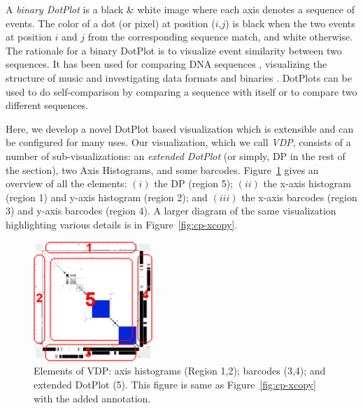 
A {\em binary DotPlot} is a black \& white image
where each axis denotes a sequence of events.
The color of a dot (or pixel) at position ($i$,$j$) is black
when the two events at position $i$ and $j$ from the corresponding sequence
match, and white otherwise.
The rationale for a binary DotPlot is to visualize event similarity
between two sequences.
It has been used for comparing DNA sequences \cite{maizel1981enhanced},
visualizing the structure of music \cite{foote1999visualizing}
and investigating data formats and binaries \cite{kaminsky2006black}.
DotPlots can be used to do self-comparison
by comparing a sequence with itself or to compare
two different sequences.

Here, we develop a novel DotPlot based visualization which is
extensible and can be configured for many uses.
Our visualization, which we call {\em VDP},
consists of a number of sub-visualizations:
an {\em extended DotPlot} (or simply, DP in the rest of the section), two
Axis Histograms, and some barcodes.
Figure~\ref{fig:elements} gives an overview of all the elements:
$(i)$ the DP (region 5);
$(ii)$ the x-axis histogram (region 1) and
y-axis histogram (region 2);
and $(iii)$ the x-axis barcodes (region 3) and
y-axis barcodes (region 4).
A larger diagram of the same visualization highlighting various
details is in Figure~\ref{fig:cp-xcopy}.

\begin{figure}[tb]
\begin{center}
\includegraphics[width=0.4\textwidth]{lviz/elements.png}
\caption{Elements of VDP: axis histograms (Region 1,2);
barcodes (3,4); and extended DotPlot (5). This figure is same as
Figure~\ref{fig:cp-xcopy} with the added annotation.}
\label{fig:elements}
\end{center}
\end{figure}

